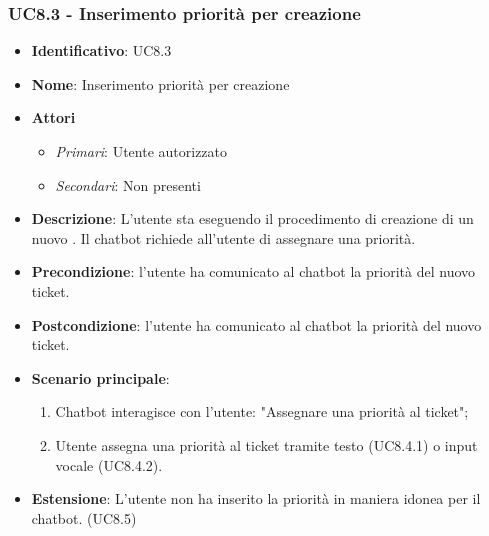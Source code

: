   \subsubsection{UC8.3 - Inserimento priorità per creazione }
\begin{itemize}
	\item \textbf{Identificativo}: UC8.3
	\item \textbf{Nome}: Inserimento priorità per creazione 
	\item \textbf{Attori}
	\begin{itemize} 
		\item \textit{Primari}: Utente autorizzato
		\item \textit{Secondari}: Non presenti
	\end{itemize}
	\item \textbf{Descrizione}: L'utente sta eseguendo il procedimento di creazione di un nuovo . Il chatbot richiede all'utente di assegnare una priorità.
	\item \textbf{Precondizione}: l'utente ha comunicato al chatbot la priorità del nuovo ticket.
	\item \textbf{Postcondizione}: l'utente ha comunicato al chatbot la priorità del nuovo ticket.
	\item \textbf{Scenario principale}: \begin{enumerate}
		\item Chatbot interagisce con l'utente: "Assegnare una priorità al ticket";
		\item Utente assegna una priorità al ticket tramite testo (UC8.4.1) o input vocale (UC8.4.2).
	\end{enumerate}
	\item \textbf{Estensione}: L'utente non ha inserito la priorità in maniera idonea per il chatbot. (UC8.5)
\end{itemize}

